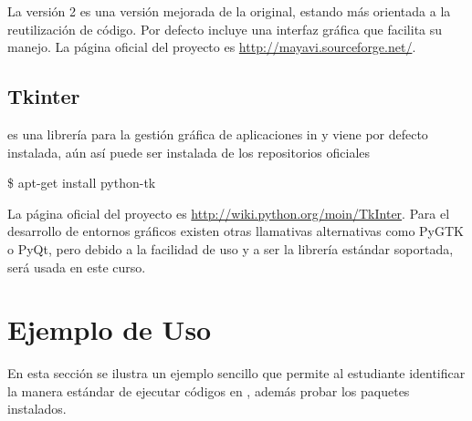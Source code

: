 La versión 2 es una versión mejorada de la original, estando más orientada
a la reutilización de código. Por defecto incluye una interfaz gráfica que
facilita su manejo. La página oficial del proyecto es 
\url{http://mayavi.sourceforge.net/}.






\subsection*{Tkinter}

\tkinter es una librería para la gestión gráfica de aplicaciones in \python 
y viene por defecto instalada, aún así puede ser instalada de los 
repositorios oficiales


\begin{listing}[style=consola, numbers=none]
\$ apt-get install python-tk
\end{listing}


La página oficial del proyecto es \url{http://wiki.python.org/moin/TkInter}.
Para el desarrollo de entornos gráficos existen otras llamativas
alternativas como PyGTK o PyQt, pero debido a la facilidad de uso y a ser
la librería estándar soportada, \tkinter será usada en este curso.









\section{Ejemplo de Uso}
\label{sec:usage}


En esta sección se ilustra un ejemplo sencillo que permite al estudiante 
identificar la manera estándar de ejecutar códigos en \python, además probar 
los paquetes instalados.

\

